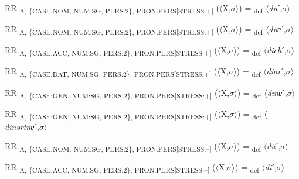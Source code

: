 {\begin{exe}
 RR \textsubscript{A, \{CASE:NOM, NUM:SG, PERS:2\}, PRON.PERS[STRESS:+]} ($\langle$X,$\sigma $$\rangle$) = \textsubscript{def} $\langle$\textit{dǖ}ˊ,$\sigma $$\rangle$
\end{exe}

\begin{exe}
 RR \textsubscript{A, \{CASE:NOM, NUM:SG, PERS:2\}, PRON.PERS[STRESS:+]} ($\langle$X,$\sigma $$\rangle$) = \textsubscript{def} $\langle$\textit{dǖɐ}ˊ,$\sigma $$\rangle$
\end{exe}

\begin{exe}
 RR \textsubscript{A, \{CASE:ACC, NUM:SG, PERS:2\}, PRON.PERS[STRESS:+]} ($\langle$X,$\sigma $$\rangle$) = \textsubscript{def} $\langle$\textit{dich}ˊ,$\sigma $$\rangle$
\end{exe}

\begin{exe}
 RR \textsubscript{A, \{CASE:DAT, NUM:SG, PERS:2\}, PRON.PERS[STRESS:+]} ($\langle$X,$\sigma $$\rangle$) = \textsubscript{def} $\langle$\textit{diar}ˊ,$\sigma $$\rangle$
\end{exe}

\begin{exe}
 RR \textsubscript{A, \{CASE:GEN, NUM:SG, PERS:2\}, PRON.PERS[STRESS:+]} ($\langle$X,$\sigma $$\rangle$) = \textsubscript{def} $\langle$\textit{d\=inɐ}ˊ,$\sigma $$\rangle$
\end{exe}

\begin{exe}
 RR \textsubscript{A, \{CASE:GEN, NUM:SG, PERS:2\}, PRON.PERS[STRESS:+]} ($\langle$X,$\sigma $$\rangle$) = \textsubscript{def} $\langle$\textit{dinərtnɐ}ˊ,$\sigma $$\rangle$
\end{exe}

\begin{exe}
 RR \textsubscript{A, \{CASE:NOM, NUM:SG, PERS:2\}, PRON.PERS[STRESS:–]} ($\langle$X,$\sigma $$\rangle$) = \textsubscript{def} $\langle$\textit{dü}ˊ,$\sigma $$\rangle$
\end{exe}

\begin{exe}
 RR \textsubscript{A, \{CASE:ACC, NUM:SG, PERS:2\}, PRON.PERS[STRESS:–]} ($\langle$X,$\sigma $$\rangle$) = \textsubscript{def} $\langle$\textit{di}ˊ,$\sigma $$\rangle$
\end{exe}

}
